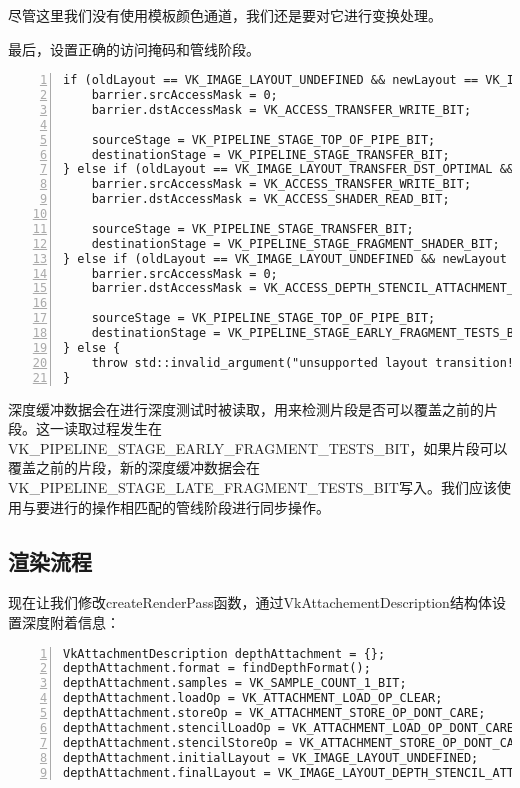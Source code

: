 \documentclass{ctexart}
\begin{document}
尽管这里我们没有使用模板颜色通道，我们还是要对它进行变换处理。

最后，设置正确的访问掩码和管线阶段。

\begin{lstlisting}[language={[ANSI]C},keywordstyle=\color{blue!70},commentstyle=\color{red!50!green!50!blue!50},frame=shadowbox, rulesepcolor=\color{red!20!green!20!blue!20},basicstyle=\small,numbers=left, numberstyle=\tiny,breaklines=true]
if (oldLayout == VK_IMAGE_LAYOUT_UNDEFINED && newLayout == VK_IMAGE_LAYOUT_TRANSFER_DST_OPTIMAL) {
	barrier.srcAccessMask = 0;
	barrier.dstAccessMask = VK_ACCESS_TRANSFER_WRITE_BIT;

	sourceStage = VK_PIPELINE_STAGE_TOP_OF_PIPE_BIT;
	destinationStage = VK_PIPELINE_STAGE_TRANSFER_BIT;
} else if (oldLayout == VK_IMAGE_LAYOUT_TRANSFER_DST_OPTIMAL && newLayout == VK_IMAGE_LAYOUT_SHADER_READ_ONLY_OPTIMAL) {
	barrier.srcAccessMask = VK_ACCESS_TRANSFER_WRITE_BIT;
	barrier.dstAccessMask = VK_ACCESS_SHADER_READ_BIT;

	sourceStage = VK_PIPELINE_STAGE_TRANSFER_BIT;
	destinationStage = VK_PIPELINE_STAGE_FRAGMENT_SHADER_BIT;
} else if (oldLayout == VK_IMAGE_LAYOUT_UNDEFINED && newLayout == VK_IMAGE_LAYOUT_DEPTH_STENCIL_ATTACHMENT_OPTIMAL) {
	barrier.srcAccessMask = 0;
	barrier.dstAccessMask = VK_ACCESS_DEPTH_STENCIL_ATTACHMENT_READ_BIT | VK_ACCESS_DEPTH_STENCIL_ATTACHMENT_WRITE_BIT;

	sourceStage = VK_PIPELINE_STAGE_TOP_OF_PIPE_BIT;
	destinationStage = VK_PIPELINE_STAGE_EARLY_FRAGMENT_TESTS_BIT;
} else {
	throw std::invalid_argument("unsupported layout transition!");
}
\end{lstlisting}

深度缓冲数据会在进行深度测试时被读取，用来检测片段是否可以覆盖之前的片段。这一读取过程发生在VK\_PIPELINE\_STAGE\_EARLY\_FRAGMENT\_TESTS\_BIT，如果片段可以覆盖之前的片段，新的深度缓冲数据会在VK\_PIPELINE\_STAGE\_LATE\_FRAGMENT\_TESTS\_BIT写入。我们应该使用与要进行的操作相匹配的管线阶段进行同步操作。

\subsection{渲染流程}

现在让我们修改createRenderPass函数，通过VkAttachementDescription结构体设置深度附着信息：

\begin{lstlisting}[language={[ANSI]C},keywordstyle=\color{blue!70},commentstyle=\color{red!50!green!50!blue!50},frame=shadowbox, rulesepcolor=\color{red!20!green!20!blue!20},basicstyle=\small,numbers=left, numberstyle=\tiny,breaklines=true]
VkAttachmentDescription depthAttachment = {};
depthAttachment.format = findDepthFormat();
depthAttachment.samples = VK_SAMPLE_COUNT_1_BIT;
depthAttachment.loadOp = VK_ATTACHMENT_LOAD_OP_CLEAR;
depthAttachment.storeOp = VK_ATTACHMENT_STORE_OP_DONT_CARE;
depthAttachment.stencilLoadOp = VK_ATTACHMENT_LOAD_OP_DONT_CARE;
depthAttachment.stencilStoreOp = VK_ATTACHMENT_STORE_OP_DONT_CARE;
depthAttachment.initialLayout = VK_IMAGE_LAYOUT_UNDEFINED;
depthAttachment.finalLayout = VK_IMAGE_LAYOUT_DEPTH_STENCIL_ATTACHMENT_OPTIMAL;
\end{lstlisting}
\end{document}
